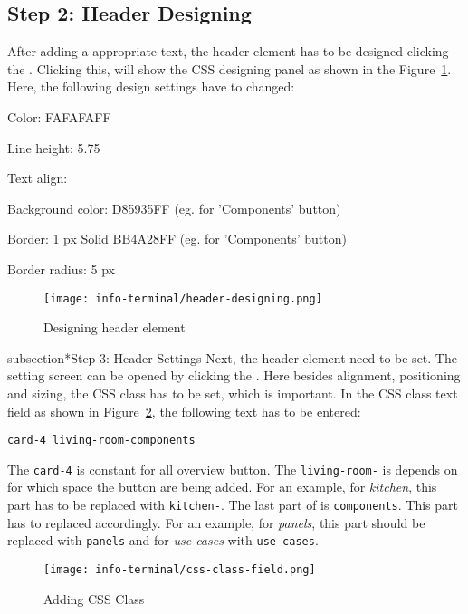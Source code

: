 \subsection*{Step 2: Header Designing}
After adding a appropriate text, the header element has to be designed clicking the . Clicking this, will show the CSS designing panel as shown in the Figure~\ref{fig:header-designing}. Here, the following design settings have to changed:
\begin{itemize*}
\item Color: FAFAFAFF
\item Line height: 5.75
\item Text align: 
\item Background color: D85935FF (eg. for 'Components' button)
\item Border: 1 px Solid BB4A28FF (eg. for 'Components' button)
\item Border radius: 5 px
\end{itemize*}

\begin{figure}[ht]
\caption{Designing header element}
\label{fig:header-designing}
\centering
\texttt{[image: info-terminal/header-designing.png]}
\end{figure}

subsection*{Step 3: Header Settings}
Next, the header element need to be set. The setting screen can be opened by clicking the . Here besides alignment, positioning and sizing, the CSS class has to be set, which is important. In the CSS class text field as shown in Figure~\ref{fig:css-class-field}, the following text has to be entered:
\begin{lstlisting}
card-4 living-room-components
\end{lstlisting}

The \texttt{card-4} is constant for all overview button. The \texttt{living-room-} is depends on for which space the button are being added. For an example, for \emph{kitchen}, this part has to be replaced with \texttt{kitchen-}. The last part of is \texttt{components}. This part has to replaced accordingly. For an example, for \emph{panels}, this part should be replaced with \texttt{panels} and for \emph{use cases} with \texttt{use-cases}.

\begin{figure}[ht]
\caption{Adding CSS Class}
\label{fig:css-class-field}
\centering
\texttt{[image: info-terminal/css-class-field.png]}
\end{figure}

